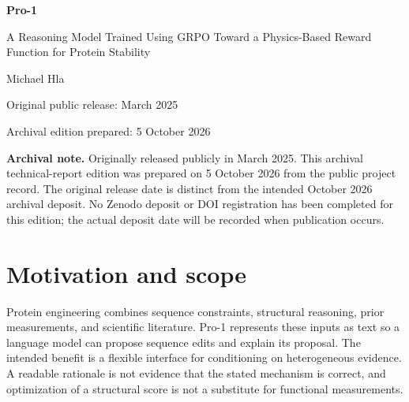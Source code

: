 \documentclass[10pt,a4paper]{article}
\begin{document}
\begin{center}
{\LARGE\bfseries Pro-1\par}
\vspace{6pt}
{\large A Reasoning Model Trained Using GRPO Toward a Physics-Based Reward Function for Protein Stability\par}
\vspace{9pt}
Michael Hla\par
\vspace{3pt}
Original public release: March 2025\par
Archival edition prepared: 5 October 2026
\end{center}
\begin{abstract}
Pro-1 explores natural-language-guided protein sequence optimization using a structure-based computational reward. Given a sequence, biological context, and prior mutagenesis results, a language model proposes modifications and an accompanying rationale. Supervised fine-tuning uses synthetic sequence-repair reasoning traces; the 8B model is subsequently trained with Group Relative Policy Optimization (GRPO), using ESMFold structure predictions and Rosetta REF2015 scores. A creativity and specificity reward variant is reported to improve benchmark performance from 43\% to 47\%, while a three-iteration critic loop reaches a reported 71\% pass rate. Success in the original 40-enzyme evaluation means any improvement in Rosetta score, not experimentally measured stability or retained activity. This report archives the March 2025 computational study, distinguishes the supervised 70B model from the GRPO-trained 8B model, and identifies the limits of proxy-based optimization. No new experiments are reported.
\end{abstract}
{\footnotesize\textbf{Archival note.} Originally released publicly in March 2025. This archival technical-report edition was prepared on 5 October 2026 from the public project record. The original release date is distinct from the intended October 2026 archival deposit. No Zenodo deposit or DOI registration has been completed for this edition; the actual deposit date will be recorded when publication occurs.\par}
\section{Motivation and scope}
Protein engineering combines sequence constraints, structural reasoning, prior measurements, and scientific literature. Pro-1 represents these inputs as text so a language model can propose sequence edits and explain its proposal. The intended benefit is a flexible interface for conditioning on heterogeneous evidence. A readable rationale is not evidence that the stated mechanism is correct, and optimization of a structural score is not a substitute for functional measurements. \cite{ref1,ref2}
\end{document}
